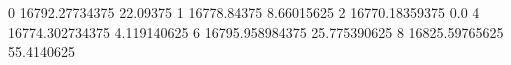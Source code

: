 0 16792.27734375 22.09375
1 16778.84375 8.66015625
2 16770.18359375 0.0
4 16774.302734375 4.119140625
6 16795.958984375 25.775390625
8 16825.59765625 55.4140625
